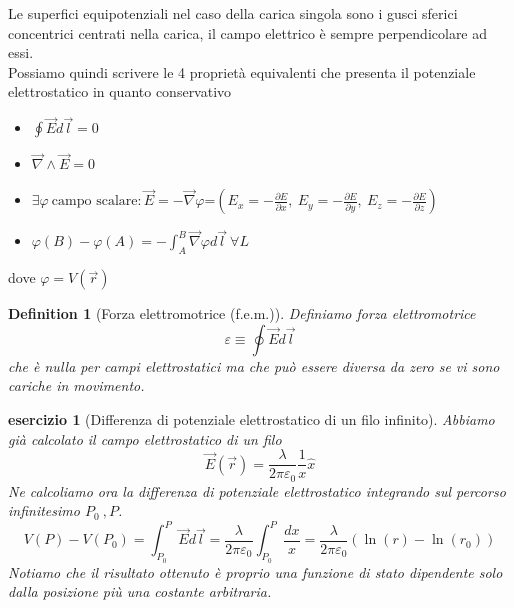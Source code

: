 \documentclass[10pt,a4paper]{article}
\newtheorem{esercizio}{esercizio}
\newtheorem{definition}{Definition}
\begin{document}
Le superfici equipotenziali nel caso della carica singola sono i gusci sferici concentrici centrati nella carica, il campo elettrico è sempre perpendicolare ad essi.\\
Possiamo quindi scrivere le 4 proprietà equivalenti che presenta il potenziale elettrostatico in quanto conservativo
\begin{itemize}
	\item \(\oint \vec{E}d\vec{l} = 0 \)
	\item \(\vec{\nabla}\wedge\vec{E} = 0\)
	\item \(\exists\varphi\  \text{campo scalare} : \vec{E}=-\vec{\nabla}\varphi\)=$\left(E_x = -\frac{\partial E}{\partial x},\ E_y= - \frac{\partial E}{\partial y},\ E_z= -\frac{\partial E}{\partial z}\right)$
	\item \(\varphi(B)-\varphi(A) = -\int_{A}^{B}\vec{\nabla}\varphi d\vec{l}\ \forall L\)
\end{itemize}
dove $\varphi = V(\vec{r})$
\begin{definition}[Forza elettromotrice (f.e.m.)]
Definiamo forza elettromotrice
\[\varepsilon \equiv \oint \vec{E}d\vec{l}\]
che è nulla per campi elettrostatici ma che può essere diversa da zero se vi sono cariche in movimento.
\end{definition}
\begin{esercizio}[Differenza di potenziale elettrostatico di un filo infinito]
Abbiamo già calcolato il campo elettrostatico di un filo
\[\vec{E}(\vec{r}) = \frac{\lambda}{2\pi\varepsilon_0}\frac{1}{x}\hat{x}\]
Ne calcoliamo ora la differenza di potenziale elettrostatico integrando sul percorso infinitesimo \(P_0\ , P\). 
\[V(P)-V(P_0) = \int_{P_0}^{P}\vec{E}d\vec{l} = \frac{\lambda}{2\pi\varepsilon_0} \int_{P_0}^{P}\frac{dx}{x}= \frac{\lambda}{2\pi\varepsilon_0} \left(\ln(r)-\ln(r_0)\right)\]
Notiamo che il risultato ottenuto è proprio una funzione di stato dipendente solo dalla posizione più una costante arbitraria.  
\end{esercizio}
\end{document}

